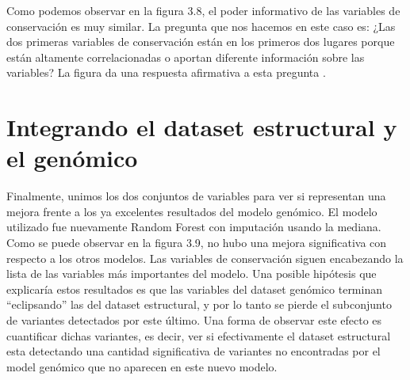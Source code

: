 Como podemos observar en la figura 3.8, el poder informativo de las variables de conservación es muy similar. La pregunta que nos hacemos en este caso es: ¿Las dos primeras variables de conservación están en los primeros dos lugares porque están altamente correlacionadas o aportan diferente información sobre las variables? La figura \todo{[x]} da una respuesta afirmativa a esta pregunta . 



\section{Integrando el dataset estructural y el genómico}

Finalmente, unimos los dos conjuntos de variables para ver si representan una mejora frente a los ya excelentes resultados del modelo genómico. El modelo utilizado fue nuevamente Random Forest con imputación usando la mediana. Como se puede observar en la figura 3.9, no hubo una mejora significativa con respecto a los otros modelos. Las variables de conservación siguen encabezando la lista de las variables más importantes del modelo. Una posible hipótesis que explicaría estos resultados es que las variables del dataset genómico terminan ``eclipsando'' las del dataset estructural, y por lo tanto se pierde el subconjunto de variantes detectados por este último. Una forma de observar este efecto es cuantificar dichas variantes, es decir, ver si efectivamente el dataset estructural esta detectando una cantidad significativa de variantes no encontradas por el model genómico que no aparecen en este nuevo modelo. 

